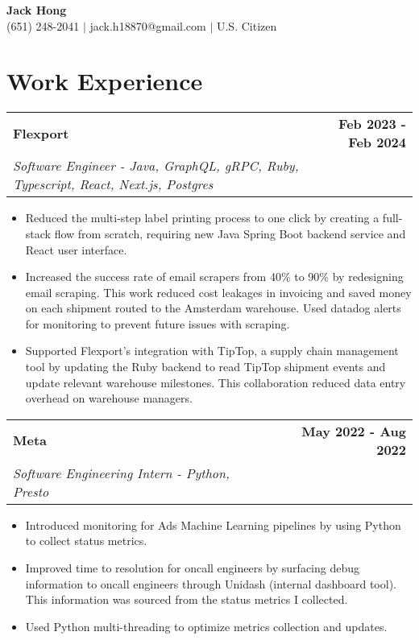 \documentclass[11pt]{extreport}
\makeatletter
\newcommand{\resumeSubheading}[4]{
  \vspace{-1pt}
    \begin{tabular*}{1.0\textwidth}{l@{\extracolsep{\fill}}r}
      \textbf{#1} & \textbf{#2}  \vspace{1mm} \\
      {#3} & \textbf{#4} \\
    \end{tabular*}\vspace{-3pt}
}
\makeatother
\begin{document}
\vspace*{-50pt}
\begin{center}
	\textbf{{\LARGE Jack Hong}} \\

    (651) 248-2041 $|$ jack.h18870@gmail.com $|$ U.S. Citizen
\end{center}

\section{Work Experience}
\resumeSubheading{Flexport}{Feb 2023 - Feb 2024}
    {\textit{Software Engineer - Java, GraphQL, gRPC, Ruby, Typescript, React, Next.js, Postgres}}{}
    \begin{itemize}[leftmargin=*]
    \item[\textperiodcentered] Reduced the multi-step label printing process to one click by creating a full-stack flow from scratch, requiring new Java Spring Boot backend service and React user interface.
\vspace{-1.5mm}
    \item[\textperiodcentered] Increased the success rate of email scrapers from 40\% to 90\% by redesigning email scraping. This work reduced cost leakages in invoicing and saved money on each shipment routed to the Amsterdam warehouse. Used datadog alerts for monitoring to prevent future issues with scraping.
\vspace{-1.5mm}
   \item[\textperiodcentered] Supported Flexport’s integration with TipTop, a supply chain management tool by updating the Ruby backend to read TipTop shipment events and update relevant warehouse milestones. This collaboration reduced data entry overhead on warehouse managers.
    \end{itemize}

\resumeSubheading{Meta}{May 2022 - Aug 2022}
    {\textit{Software Engineering Intern - Python, Presto}}{}
    \begin{itemize}[leftmargin=*]
     \item[\textperiodcentered] Introduced monitoring for Ads Machine Learning pipelines by using Python to collect status metrics.
\vspace{-1.5mm}
    \item[\textperiodcentered] Improved time to resolution for oncall engineers by surfacing debug information to oncall engineers through Unidash (internal dashboard tool). This information was sourced from the status metrics I collected.
\vspace{-1.5mm}
     \item[\textperiodcentered] Used Python multi-threading to optimize metrics collection and updates.
    \end{itemize}
    
\end{document}

